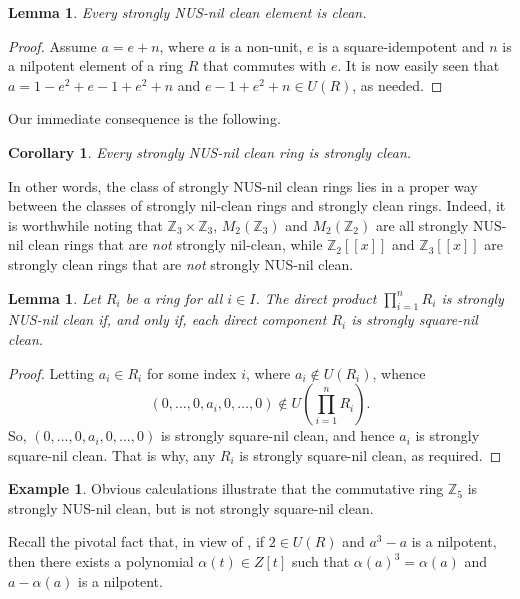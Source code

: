 \documentclass[12pt]{amsart}
\newtheorem{lemma}[theorem]{Lemma}
\newtheorem{corollary}[theorem]{Corollary}
\theoremstyle{definition}
\newtheorem{example}[theorem]{Example}
\begin{document}
\begin{lemma}\label{2.2}
Every strongly NUS-nil clean element is clean.
\end{lemma}

\begin{proof}
Assume $a = e + n$, where $a$ is a non-unit, $e$ is a square-idempotent and $n$ is a nilpotent element of a ring $R$ that commutes with $e$. It is now easily seen that $a=1-e^2+e-1+e^2+n$ and $e-1+e^2+n\in U(R)$, as needed.
\end{proof}

Our immediate consequence is the following.

\begin{corollary}\label{2.3}
Every strongly NUS-nil clean ring is strongly clean.
\end{corollary}

In other words, the class of strongly NUS-nil clean rings lies in a proper way between the classes of strongly nil-clean rings and strongly clean rings. Indeed, it is worthwhile noting that $\mathbb{Z}_3\times \mathbb{Z}_3$, $M_2(\mathbb{Z}_3)$ and $M_2(\mathbb{Z}_2)$ are all strongly NUS-nil clean rings that are {\it not} strongly   nil-clean, while $\mathbb{Z}_{2}[[x]]$ and $\mathbb{Z}_{3}[[x]]$ are strongly clean rings that are {\it not} strongly NUS-nil clean.

\begin{lemma}\label{2.4}
Let $R_{i}$ be a ring for all $i\in I$. The direct product $\prod_{i=1}^{n} R_i$ is strongly NUS-nil clean if, and only if, each direct component $R_{i}$ is strongly square-nil clean.
\end{lemma}

\begin{proof}
Letting $a_{i}\in R_{i}$ for some index $i$, where $a_{i}\notin U(R_{i})$, whence $$(0,\ldots,0,a_{i},0,\ldots,0)\notin  U(\prod^{n}_{i=1}R_{i}).$$ So, $(0,\ldots,0,a_{i},0,\ldots,0)$ is strongly square-nil clean, and hence $a_{i}$ is strongly square-nil clean. That is why, any $R_{i}$ is strongly square-nil clean, as required.
\end{proof}

\begin{example}
Obvious calculations illustrate that the commutative ring $\mathbb{Z}_5$ is strongly NUS-nil clean, but is not strongly square-nil clean.	
\end{example}

Recall the pivotal fact that, in view of \cite[Lemma 2.6]{zhou}, if $2 \in U(R)$ and $a^3 -a$ is a nilpotent, then there exists a polynomial $\alpha(t) \in Z[t]$ such that $\alpha(a)^3 = \alpha(a)$ and $a -\alpha(a)$ is a nilpotent.
\end{document}

